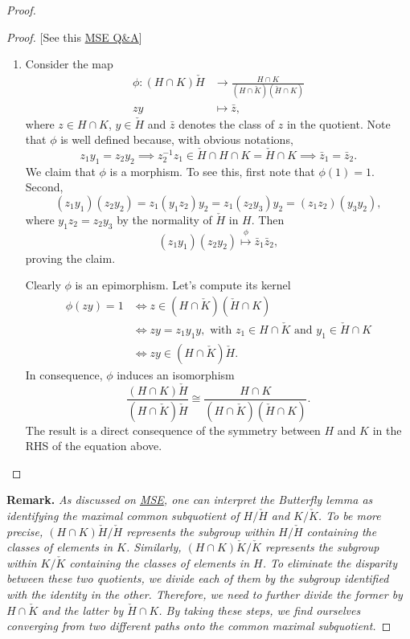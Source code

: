 \begin{solution}
\begin{proof}
\begin{proof} {[See this \href{https://math.stackexchange.com/q/3857104/269050}{MSE Q\&A}]}
\begin{enumerate}[\rm a)]
    \item Consider the map
    \begin{align*}
        \phi\colon(H\cap K)\check H&\to\frac{H\cap K}{(H\cap\check K)(\check H\cap K)}\\
        zy&\mapsto\bar z,
    \end{align*}
    where $z\in H\cap K$, $y\in\check H$ and $\bar z$ denotes the class of $z$ in the quotient. Note that $\phi$ is well defined because, with obvious notations, 
    $$
        z_1y_1=z_2y_2
            \implies z_2^{-1}z_1\in \check H\cap H\cap K
                =\check H\cap K
            \implies\bar z_1=\bar z_2.
    $$
    We claim that $\phi$ is a morphism. To see this, first note that $\phi(1)=1$. Second,
    $$
        (z_1y_1)(z_2y_2)=z_1(y_1z_2)y_2=z_1(z_2y_3)y_2=(z_1z_2)(y_3y_2),
    $$
    where $y_1z_2=z_2y_3$ by the normality of $\check H$ in $H$. Then
    $$
        (z_1y_1)(z_2y_2)\stackrel{\phi}{\mapsto}\bar z_1\bar z_2,
    $$
    proving the claim.

    Clearly $\phi$ is an epimorphism. Let's compute its kernel
    \begin{align*}
        \phi(zy) = 1 &\iff z\in (H\cap\check K)(\check H\cap K)\\
            &\iff zy=z_1y_1y,
                \text{ with }z_1\in H\cap\check K
                \text{ and }y_1\in\check H\cap K\\
            &\iff zy\in(H\cap\check K)\check H.
    \end{align*}
    In consequence, $\phi$ induces an isomorphism
    $$
         \frac{(H\cap K){\check H}}{(H\cap {\check K}){\check H}}
            \cong \frac{H\cap K}{(H\cap\check K)(\check H\cap K)}.
    $$
    The result is a direct consequence of the symmetry between $H$ and $K$ in the RHS of the equation above.
\end{enumerate}
\end{proof}

\medskip

\textbf{Remark.} \textit{As discussed on \href{https://math.stackexchange.com/a/4450392/269050}{MSE}, one can interpret the\/ {\rm Butterfly lemma} as identifying the maximal common subquotient of\/ $H/\check{H}$ and\/ $K/\check{K}$. To be more precise, $(H \cap K)\check{H}/\check{H}$ represents the subgroup within\/ $H/\check{H}$ containing the classes of elements in\/ $K$. Similarly, $(H \cap K)\check{K}/\check{K}$ represents the subgroup within\/ $K/\check{K}$ containing the classes of elements in\/ $H$. To eliminate the disparity between these two quotients, we divide each of them by the subgroup identified with the identity in the other. Therefore, we need to further divide the former by\/ $H \cap \check{K}$ and the latter by $\check{H} \cap K$. By taking these steps, we find ourselves converging from two different paths onto the common maximal subquotient.}


\end{proof}
\end{solution}
